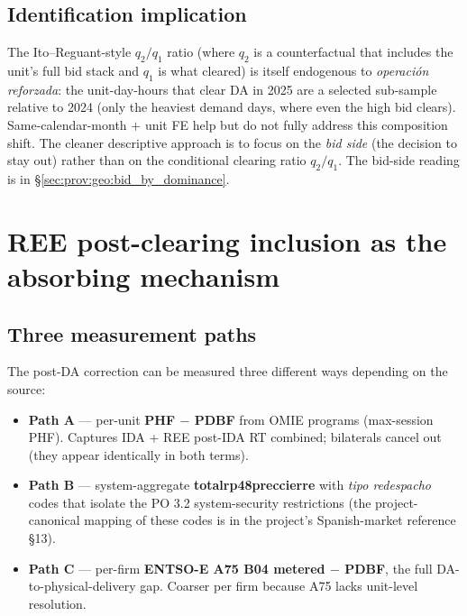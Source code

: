 \documentclass[11pt,a4paper]{article}
\begin{document}
\subsection{Identification implication}\label{sec:prov:q1_drop:ident}

The Ito--Reguant-style $q_2/q_1$ ratio (where $q_2$ is a counterfactual that includes the unit's full bid stack and $q_1$ is what cleared) is itself endogenous to \emph{operación reforzada}: the unit-day-hours that clear DA in 2025 are a selected sub-sample relative to 2024 (only the heaviest demand days, where even the high bid clears). Same-calendar-month $+$ unit FE help but do not fully address this composition shift. The cleaner descriptive approach is to focus on the \emph{bid side} (the decision to stay out) rather than on the conditional clearing ratio $q_2 / q_1$. The bid-side reading is in \S\ref{sec:prov:geo:bid_by_dominance}.


\section{REE post-clearing inclusion as the absorbing mechanism}\label{sec:prov:phf_minus_pdbf}

\subsection{Three measurement paths}\label{sec:prov:phf_minus_pdbf:paths}

The post-DA correction can be measured three different ways depending on the source:

\begin{itemize}\setlength{\itemsep}{1pt}
\item \textbf{Path A} --- per-unit \textbf{PHF $-$ PDBF} from OMIE programs (max-session PHF). Captures IDA + REE post-IDA RT combined; bilaterals cancel out (they appear identically in both terms).
\item \textbf{Path B} --- system-aggregate \textbf{totalrp48preccierre} with \emph{tipo redespacho} codes that isolate the PO 3.2 system-security restrictions (the project-canonical mapping of these codes is in the project's Spanish-market reference \S13).
\item \textbf{Path C} --- per-firm \textbf{ENTSO-E A75 B04 metered $-$ PDBF}, the full DA-to-physical-delivery gap. Coarser per firm because A75 lacks unit-level resolution.
\end{itemize}
\end{document}
